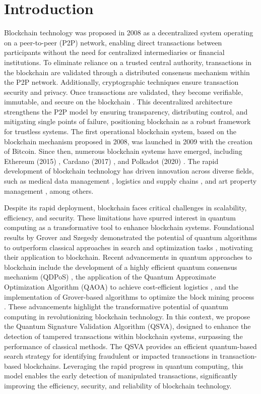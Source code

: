 \documentclass[nofootinbib,aps,prd,reprint,superscriptaddress,floatfix]{revtex4-2}
\begin{document}
\section{Introduction}\label{Introduction}

Blockchain technology was proposed in 2008 \cite{Bitcoin_nakamoto} as a decentralized system operating on a peer-to-peer (P2P) network, enabling direct transactions between participants without the need for centralized intermediaries or financial institutions. To eliminate reliance on a trusted central authority, transactions in the blockchain are validated through a distributed consensus mechanism within the P2P network. Additionally, cryptographic techniques ensure transaction security and privacy. Once transactions are validated, they become verifiable, immutable, and secure on the blockchain \cite{Chen2018blockchain}. This decentralized architecture strengthens the P2P model by ensuring transparency, distributing control, and mitigating single points of failure, positioning blockchain as a robust framework for trustless systems. The first operational blockchain system, based on the blockchain mechanism proposed in 2008, was launched in 2009 with the creation of Bitcoin. Since then, numerous blockchain systems have emerged, including Ethereum (2015) \cite{Ethereum}, Cardano (2017) \cite{Cardano}, and Polkadot (2020) \cite{Polkadot}. The rapid development of blockchain technology has driven innovation across diverse fields, such as medical data management \cite{Medical_data_blockchain}, logistics and supply chains \cite{Logistic_blockchain,Supply_chain_blockchain}, and art property management \cite{Art_blockchain}, among others. 

Despite its rapid deployment, blockchain faces critical challenges in scalability, efficiency, and security. These limitations have spurred interest in quantum computing as a transformative tool to enhance blockchain systems. Foundational results by Grover and Szegedy demonstrated the potential of quantum algorithms to outperform classical approaches in search and optimization tasks \cite{Grover,Szegedy}, motivating their application to blockchain. Recent advancements in quantum approaches to blockchain include the development of a highly efficient quantum consensus mechanism (QDPoS) \cite{Quantum_blockchain_2}, the application of the Quantum Approximate Optimization Algorithm (QAOA) to achieve cost-efficient logistics \cite{Quantum_blockchain_optimization}, and the implementation of Grover-based algorithms to optimize the block mining process \cite{Qauntum_blockchain_mining}. These advancements highlight the transformative potential of quantum computing in revolutionizing blockchain technology. In this context, we propose the Quantum Signature Validation Algorithm (QSVA), designed to enhance the detection of tampered transactions within blockchain systems, surpassing the performance of classical methods. The QSVA provides an efficient quantum-based search strategy for identifying fraudulent or impacted transactions in transaction-based blockchains. Leveraging the rapid progress in quantum computing, this model enables the early detection of manipulated transactions, significantly improving the efficiency, security, and reliability of blockchain technology. 
\end{document}
